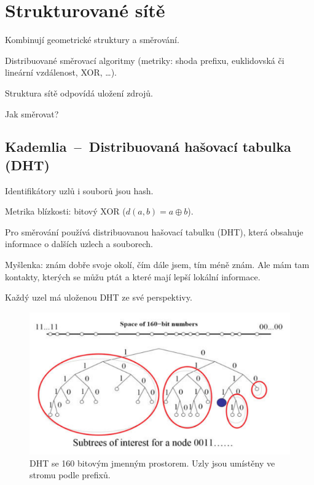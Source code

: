 
\section{Strukturované sítě}

\begin{compactitem}
    \item Kombinují geometrické struktury a směrování.
    \item Distribuované směrovací algoritmy (metriky: shoda prefixu, euklidovská či lineární vzdálenost, XOR, \dots).
    \item Struktura sítě odpovídá uložení zdrojů.
    \item Jak směrovat?
\end{compactitem}

\subsection{Kademlia~--~Distribuovaná hašovací tabulka (DHT)}

\begin{compactitem}
    \item Identifikátory uzlů i souborů jsou hash.
    \item Metrika blízkosti: bitový XOR ($d(a, b) = a \oplus b$).
    \item Pro směrování používá distribuovanou hašovací tabulku (DHT), která obsahuje informace o dalších uzlech a souborech. \begin{compactitem}
        \item Myšlenka: znám dobře svoje okolí, čím dále jsem, tím méně znám. Ale mám tam kontakty, kterých se můžu ptát a které mají lepší lokální informace.
        \item Každý uzel má uloženou DHT ze své perspektivy.
    \end{compactitem}
\end{compactitem}

\begin{figure}[htb!]
    \centering
    \includegraphics[width=1\linewidth]{dht_1.pdf}
    \caption{DHT se 160 bitovým jmenným prostorem. Uzly jsou umístěny ve stromu podle prefixů.}
\end{figure}

